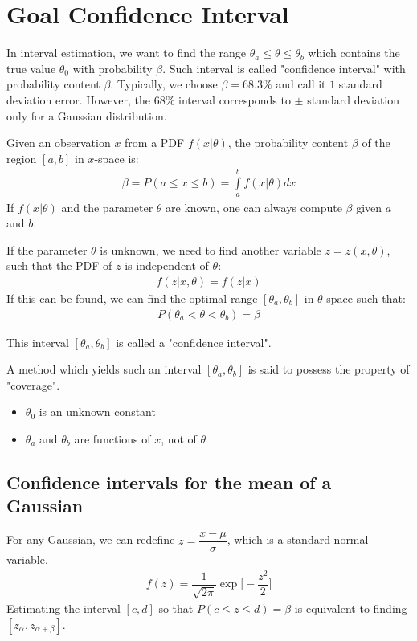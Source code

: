 \section{Goal  Confidence Interval} \label{sec:interval_estimation_goal_conf_interval}
In interval estimation, we want to find the range $\theta_a \leq \theta \leq \theta_b$ which contains the true value $\theta_0$ with probability $\beta$. Such interval is called "confidence interval" with probability content $\beta$. Typically, we choose $\beta=68.3\%$ and call it $1$ standard deviation error. However, the $68\%$ interval corresponds to $\pm$ standard deviation only for a Gaussian distribution.

Given an observation $x$ from a PDF $f(x|\theta)$, the probability content $\beta$ of the region $[a,b]$ in $x$-space is:
\begin{align}
    \beta = P(a \leq x \leq b) = \int \limits_a^b f(x|\theta) dx
\end{align}
If $f(x|\theta)$ and the parameter $\theta$ are known, one can always compute $\beta$ given $a$ and $b$.

If the parameter $\theta$ is unknown, we need to find another variable $z=z(x,\theta)$, such that the PDF of $z$ is independent of $\theta$:
\begin{align}
    f(z|x,\theta) = f(z|x)
\end{align}
If this can be found, we can find the optimal range $[\theta_a, \theta_b]$ in $\theta$-space such that:
\begin{align}
    P(\theta_a < \theta < \theta_b) = \beta
\end{align}

This interval $[\theta_a, \theta_b]$ is called a "confidence interval".

A method which yields such an interval $[\theta_a, \theta_b]$ is said to possess the property of "coverage".

\begin{itemize}[$\to$]
    \item $\theta_0$ is an unknown constant 
    \item $\theta_a$ and $\theta_b$ are functions of $x$, not of $\theta$
\end{itemize}

\subsection{Confidence intervals for the mean of a Gaussian} \label{conf_int_mean_of_gaussian}
For any Gaussian, we can redefine $z=\dfrac{x-\mu}{\sigma}$, which is a standard-normal variable. 
\begin{align}
    f(z) = \dfrac{1}{\sqrt{2\pi}}\exp{\Big [ - \dfrac{z^2}{2}\Big]}
\end{align}
Estimating the interval $[c,d]$ so that $P(c\leq z \leq d) = \beta$ is equivalent to finding $[z_\alpha, z_{\alpha+\beta}]$.

